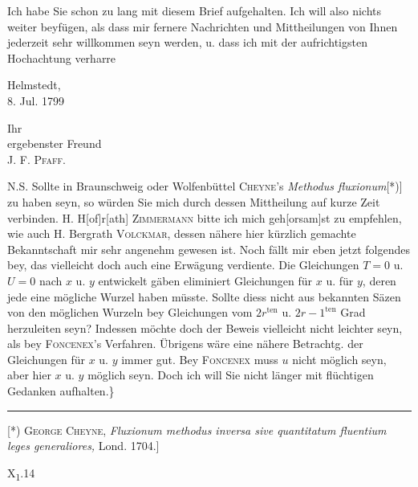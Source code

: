 Ich habe Sie schon zu lang mit diesem Brief aufgehalten. Ich will also nichts weiter beyfügen,
als dass mir fernere Nachrichten und Mittheilungen von Ihnen jederzeit sehr willkommen seyn
werden, u. dass ich mit der aufrichtigsten Hochachtung verharre
\par\medskip
\noindent\begin{minipage}[b]{.35\linewidth}
\begin{center}Helmstedt,\\8. Jul. 1799\end{center}
\end{minipage}\hfill
\begin{minipage}[b]{.5\linewidth}
\begin{center}Ihr\\ergebenster Freund\\J. F. \textsc{Pfaff}.\end{center}
\end{minipage}\par\medskip
\noindent\hspace*{\parindent}N.S. Sollte in Braunschweig oder Wolfenbüttel \textsc{Cheyne}’s
\textit{Methodus fluxionum}[*)] zu haben seyn, so würden Sie mich durch dessen Mittheilung
auf kurze Zeit verbinden. H. H[of]r[ath] \textsc{Zimmermann} bitte ich mich geh[orsam]st zu
empfehlen, wie auch H. Bergrath \textsc{Volckmar}, dessen nähere hier kürzlich gemachte
Bekanntschaft mir sehr angenehm gewesen ist. Noch fällt mir eben jetzt folgendes bey,
das vielleicht doch auch eine Erwägung verdiente. Die Gleichungen $T=0$ u. $U=0$ nach $x$ u. $y$
entwickelt gäben eliminiert Gleichungen für $x$ u. für $y$, deren jede eine mögliche Wurzel haben
müsste. Sollte diess nicht aus bekannten Säzen von den möglichen Wurzeln bey Gleichungen vom
$2r^{\mathrm{ten}}$ u. $2r-1^{\mathrm{ten}}$ Grad herzuleiten seyn? Indessen möchte doch der
Beweis vielleicht nicht leichter seyn, als bey \textsc{Foncenex}’s Verfahren.
Übrigens wäre eine nähere Betrachtg. der Gleichungen für $x$ u. $y$ immer gut.
Bey \textsc{Foncenex} muss $u$ nicht möglich seyn, aber hier  $x$ u. $y$
möglich seyn. Doch ich will Sie nicht länger mit flüchtigen Gedanken aufhalten.\}
\par\smallskip\noindent\rule{.25\linewidth}{.4pt}\par\smallskip
\begingroup\small
\noindent\hspace*{\parindent}[*) \textsc{George Cheyne}, \textit{Fluxionum methodus inversa sive
quantitatum fluentium leges generaliores,} Lond. 1704.]
\par\endgroup
\vfill\noindent X\textsubscript{1}.\hfill 14
\clearpage
